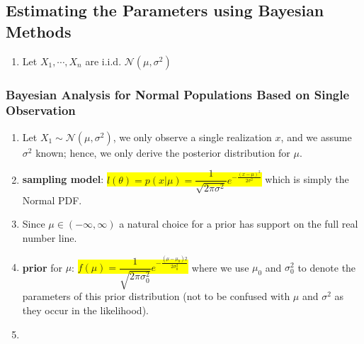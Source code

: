 \subsection{Estimating the Parameters using Bayesian Methods}

\begin{enumerate}
    \item Let $X_1, \cdots, X _n$ are i.i.d. $\mathcal{N} (\mu, \sigma^2)$
    \hfill \cite{statistics/book/Statistics-for-Data-Scientists/Maurits-Kaptein}

\end{enumerate}

\subsubsection{Bayesian Analysis for Normal Populations Based on Single Observation}

\begin{enumerate}
    \item Let $X_1 \sim \mathcal{N} (\mu, \sigma^2)$, we only observe a single realization $x$, and we assume $\sigma^2$ known; hence, we only derive the posterior distribution for $\mu$.
    \hfill \cite{statistics/book/Statistics-for-Data-Scientists/Maurits-Kaptein}

    \item \textbf{sampling model}: 
    \colorbox{yellow}{$
        l(\theta) 
        = p(x|\mu)
        = \dfrac{1}{\sqrt{2\pi\sigma^2}} e ^{-\tfrac{(x-\mu)^2}{ 2\sigma^2 }}
    $}
    which is simply the Normal PDF.
    \hfill \cite{statistics/book/Statistics-for-Data-Scientists/Maurits-Kaptein}

    \item Since $\mu \in (-\infty, \infty)$ a natural choice for a prior has support on the full real number line.
    \hfill \cite{statistics/book/Statistics-for-Data-Scientists/Maurits-Kaptein}

    \item \textbf{prior} for $\mu$: 
    \colorbox{yellow}{$
        f (\mu) 
        = \dfrac{1 }{\sqrt{2\pi\sigma^2 _0}} e ^{-\tfrac{(\mu-\mu_0 )2} {2\sigma^2 _0} }
    $}
    where we use $\mu_0$ and $\sigma^2 _0$ to denote the parameters of this prior distribution (not to be confused with $\mu$ and $\sigma^2$ as they occur in the likelihood).
    \hfill \cite{statistics/book/Statistics-for-Data-Scientists/Maurits-Kaptein}

    \item 
    \hfill \cite{statistics/book/Statistics-for-Data-Scientists/Maurits-Kaptein}
\end{enumerate}












